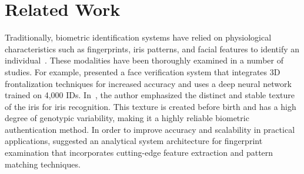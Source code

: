     
\section{Related Work}
 Traditionally, biometric identification systems have relied on physiological characteristics such as fingerprints, iris patterns, and facial features to identify an individual~\cite{shaheed2021systematic}.  These modalities have been thoroughly examined in a number of studies.  For example, \cite{taigman2014deepface} presented a face verification system that integrates 3D frontalization techniques for increased accuracy and uses a deep neural network trained on 4,000 IDs. In~\cite{nguyen2024deep}, the author emphasized the distinct and stable texture of the iris for iris recognition. This texture is created before birth and has a high degree of genotypic variability, making it a highly reliable biometric authentication method.  In order to improve accuracy and scalability in practical  applications, \cite{arslan2025analytical} suggested an analytical system architecture for  fingerprint examination that incorporates cutting-edge feature extraction and pattern matching techniques. 
 
